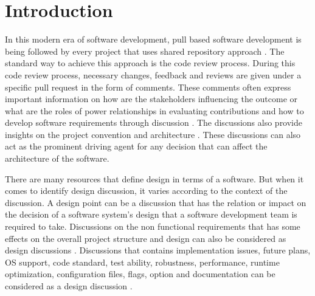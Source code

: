 \section{Introduction}
\label{sect:introduction}
In this modern era of software development, pull based software development is being followed by every project that uses shared repository approach \cite{Gousios2014}. The standard way to achieve this approach is the code review process. During this code review process, necessary changes, feedback and reviews are given under a specific pull request in the form of comments. These comments often express important information on how are the stakeholders influencing the outcome or what are the roles of power relationships in evaluating contributions and how to develop software requirements through discussion \cite{Tsay2014}. The discussions also provide insights on the project convention and architecture \cite{Motta2018}. These discussions can also act as the prominent driving agent for any decision that can affect the architecture of the software.

There are many resources that define design in terms of a software. But when it comes to identify design discussion, it varies according to the context of the discussion. A design point \cite{Viviani2018} can be a discussion that has the relation or impact on the decision of a software system's design that a software development team is required to take. Discussions on the non functional requirements that has some effects on the overall project structure and design can also be considered as design discussions \cite{Sousa2018}. Discussions that contains implementation issues, future plans, OS support, code standard, test ability, robustness, performance, runtime optimization, configuration files, flags, option and documentation can be considered as a design discussion \cite{Viviani2018}.


